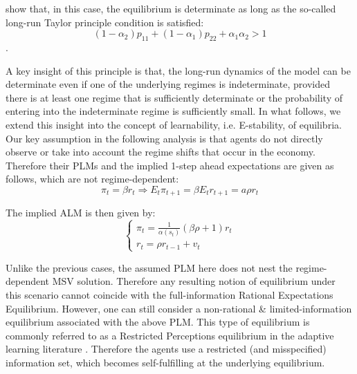 \documentclass[12pt,reqno]{article}
\numberwithin{equation}{section}
\begin{document}
\cite{davig2007generalizing} show that, in this case, the equilibrium is determinate as long as the so-called long-run Taylor principle condition is satisfied: \\


$$ (1-\alpha_2) p_{11} +(1-\alpha_1) p_{22} + \alpha_1 \alpha_2 > 1 $$. 

A key insight of this principle is that, the long-run dynamics of the model can be determinate even if one of the underlying regimes is indeterminate, provided there is at least one regime that is sufficiently determinate or the probability of entering into the indeterminate regime is sufficiently small. In what follows, we extend this insight into the concept of learnability, i.e. E-stability, of equilibria. Our key assumption in the following analysis is that agents do not directly observe or take into account the regime shifts that occur in the economy. Therefore their PLMs and the implied 1-step ahead expectations are given as follows, which are not regime-dependent: \\

$$
\pi_t = \beta r_t  \Rightarrow E_t \pi_{t+1} = \beta E_t r_{t+1} = a \rho r_t 
$$

The implied ALM is then given by: \\

$$
\begin{cases}
\pi_t = \frac{1}{\alpha(s_t)} (\beta \rho + 1) r_t \\
r_t= \rho r_{t-1} + v_t 
\end{cases}
$$ 

Unlike the previous cases, the assumed PLM here does not nest the regime-dependent MSV solution. Therefore any resulting notion of equilibrium under this scenario cannot coincide with the full-information Rational Expectations Equilibrium. However, one can still consider a non-rational  \& limited-information equilibrium associated with the above PLM. This type of equilibrium is commonly referred to as a Restricted Perceptions equilibrium in the adaptive learning literature \citep{evans2012learning}. Therefore the agents use a restricted (and misspecified) information set, which becomes self-fulfilling at the underlying equilibrium. \\
\end{document}
